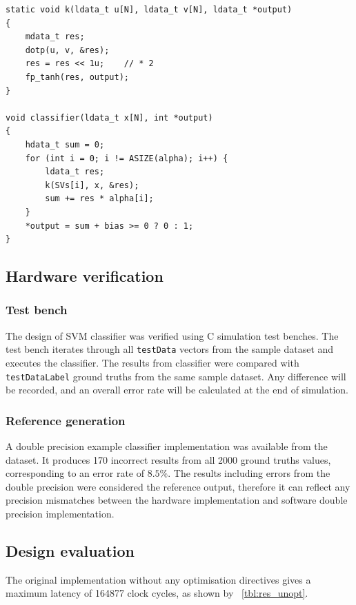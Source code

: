 \documentclass[journal]{IEEEtran}
\newcommand{\tref}[1]{\tablename~\ref{#1}}
\begin{document}
\begin{lstlisting}[float,floatplacement=h,caption={Top-level SVM classifier},captionpos=b,label=lst:clas]
static void k(ldata_t u[N], ldata_t v[N], ldata_t *output)
{
	mdata_t res;
	dotp(u, v, &res);
	res = res << 1u;	// * 2
	fp_tanh(res, output);
}

void classifier(ldata_t x[N], int *output)
{
	hdata_t sum = 0;
	for (int i = 0; i != ASIZE(alpha); i++) {
		ldata_t res;
		k(SVs[i], x, &res);
		sum += res * alpha[i];
	}
	*output = sum + bias >= 0 ? 0 : 1;
}	
\end{lstlisting}

\subsection{Hardware verification}

\subsubsection{Test bench}

The design of SVM classifier was verified using C simulation test benches. The test bench iterates through all \texttt{testData} vectors from the sample dataset and executes the classifier. The results from classifier were compared with \texttt{testDataLabel} ground truths from the same sample dataset. Any difference will be recorded, and an overall error rate will be calculated at the end of simulation.

\subsubsection{Reference generation}

A double precision example classifier implementation was available from the dataset. It produces 170 incorrect results from all 2000 ground truths values, corresponding to an error rate of $8.5 \%$. The results including errors from the double precision were considered the reference output, therefore it can reflect any precision mismatches between the hardware implementation and software double precision implementation.

\subsection{Design evaluation}

The original implementation without any optimisation directives gives a maximum latency of 164877 clock cycles, as shown by \tref{tbl:res_unopt}.
\end{document}
